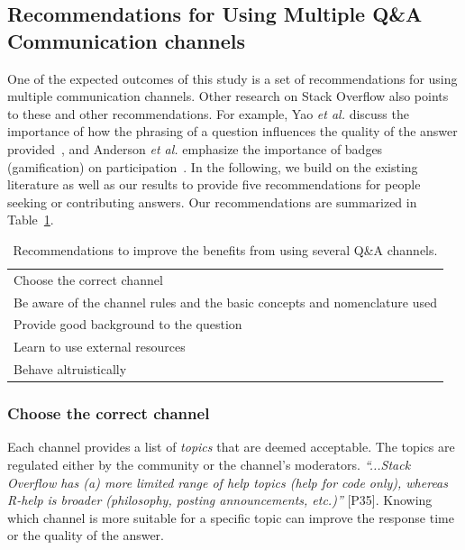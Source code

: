 \documentclass[smallextended]{svjour3}       %
\newcommand{\channels}{communication channels\xspace}
\newcommand{\Channels}{Communication channels\xspace}
\newcommand{\SO}{Stack Overflow\xspace}
\newcommand{\RH}{R-help\xspace}
\newcommand{\reca}{Choose the correct channel}
\newcommand{\recb}{Be aware of the channel rules and the basic concepts and nomenclature used}
\newcommand{\recc}{Provide good background to the question}
\newcommand{\recd}{Learn to use external resources}
\newcommand{\rece}{Behave altruistically}
\begin{document}
\subsection{Recommendations for Using Multiple Q\&A \Channels}



One of the expected outcomes of this study is a set of recommendations for using multiple \channels. Other research on \SO also points to these and other recommendations.  For example, Yao \textit{et al.} discuss the importance of how the phrasing of a question influences the quality of the answer provided~\cite{Yao2013a}, and Anderson \textit{et al.} emphasize the importance of badges (gamification) on participation~\cite{Anderson2013}. In the following, we build on the existing literature as well as our results to  provide five recommendations for people seeking or contributing answers.  Our recommendations are summarized in Table~\ref{tab:recom}.



    \begin{table}[htbp]
      \caption{Recommendations to improve the benefits from using several Q\&A channels.}
      \centering
\small
      \begin{tabularx}{1.0\linewidth}[h]{@{}X@{}}
          \toprule
\reca \\
\recb \\
\recc \\
\recd \\
\rece \\
          \bottomrule
      \end{tabularx}
      \label{tab:recom}
    \end{table}




\subsubsection{\reca}


    Each channel provides a list of \textit{topics} that are deemed acceptable.
    The topics are regulated either by the community or the channel's moderators. \textit{``...\SO has (a) more limited range of help topics (help for code only), whereas \RH is broader (philosophy, posting announcements, etc.)''} [P35].
    Knowing which channel is more suitable for a specific topic can improve the response time or the quality of the answer.
\end{document}
